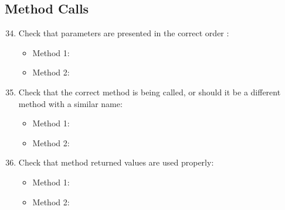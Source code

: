 \subsection{Method Calls}
\begin{enumerate}
	\setcounter{enumi}{33}
	\item Check that parameters are presented in the correct order :
	\begin{itemize}
		\item Method 1: \cmark
		\item Method 2: \cmark
	\end{itemize}
	\item Check that the correct method is being called, or should it be a different method with a similar name:
	\begin{itemize}
		\item Method 1: \cmark
		\item Method 2: \cmark
	\end{itemize}
	\item Check that method returned values are used properly:
	\begin{itemize}
		\item Method 1: \cmark
		\item Method 2: \cmark
	\end{itemize}
\end{enumerate}